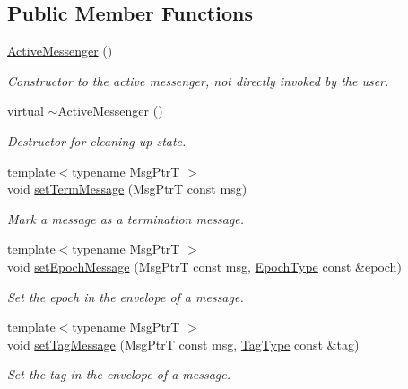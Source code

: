 \subsection*{Public Member Functions}
\begin{DoxyCompactItemize}
\item 
\hyperlink{structvt_1_1messaging_1_1_active_messenger_ab6b4f326bf77ec032d8ba86d51899c60}{Active\+Messenger} ()
\begin{DoxyCompactList}\small\item\em Constructor to the active messenger, not directly invoked by the user. \end{DoxyCompactList}\item 
virtual \hyperlink{structvt_1_1messaging_1_1_active_messenger_a10ef2a3dae9bcaddaa1f80903274e7b3}{$\sim$\+Active\+Messenger} ()
\begin{DoxyCompactList}\small\item\em Destructor for cleaning up state. \end{DoxyCompactList}\item 
{\footnotesize template$<$typename Msg\+PtrT $>$ }\\void \hyperlink{structvt_1_1messaging_1_1_active_messenger_a118cce5305dc29493af96565c5b5d4a5}{set\+Term\+Message} (Msg\+PtrT const msg)
\begin{DoxyCompactList}\small\item\em Mark a message as a termination message. \end{DoxyCompactList}\item 
{\footnotesize template$<$typename Msg\+PtrT $>$ }\\void \hyperlink{structvt_1_1messaging_1_1_active_messenger_a3ef2064f1e18e3e596850fbf953a01b9}{set\+Epoch\+Message} (Msg\+PtrT const msg, \hyperlink{namespacevt_a985a5adf291c34a3ca263b3378388236}{Epoch\+Type} const \&epoch)
\begin{DoxyCompactList}\small\item\em Set the epoch in the envelope of a message. \end{DoxyCompactList}\item 
{\footnotesize template$<$typename Msg\+PtrT $>$ }\\void \hyperlink{structvt_1_1messaging_1_1_active_messenger_a3f93d594757e59cefcf6b07ba33c561b}{set\+Tag\+Message} (Msg\+PtrT const msg, \hyperlink{namespacevt_a84ab281dae04a52a4b243d6bf62d0e52}{Tag\+Type} const \&tag)
\begin{DoxyCompactList}\small\item\em Set the tag in the envelope of a message. \end{DoxyCompactList}\item 

\end{DoxyCompactItemize}
